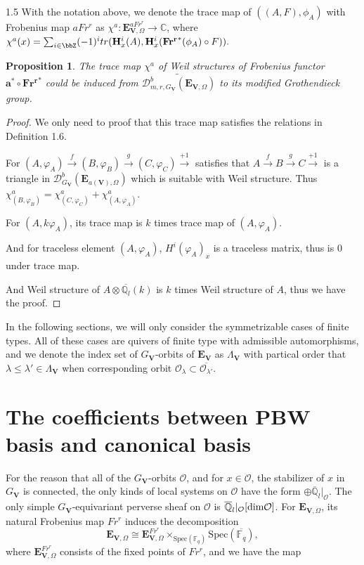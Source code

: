 \documentclass[10pt]{amsart}
\newtheorem{proposition}[theorem]{Proposition}
\def\bbC{{\mathbb C}}  \def\bbE{{\mathbb E}}  \def\bbP{{\mathbb P}}
\def\dim{\mbox{\rm dim}}   \def\End{\mbox{\rm End}}
\def\bfV{{\mathbf V}}
\def\bfV{\mathbf{V}}
\def\bfE{\mathbf{E}}
\newcommand\mo{{\mathcal{O}}}
\begin{document}
\begin{spacing}{1.5}
With the notation above, we denote the trace map of $((A,F),\phi_A)$ with Frobenius map $aFr^r$ as $\chi^a:\mathbf{E}_{\mathbf{V}, \Omega}^{aFr^r}\rightarrow \bbC$, where $\chi^a(x)=\sum_{i\in \bbZ}(-1)^itr(\mathbf{H}^i_x(A),\mathbf{H}^i_x(\mathbf{Fr^r}^*(\phi_A)\circ F)).$
\begin{proposition}\label{po1}
    The trace map $\chi^a$ of Weil structures of Frobenius functor $\mathbf{a}^*\circ \mathbf{Fr^r}^*$ could be induced from $\widetilde{\mathcal{D}^b_{m,r, G_{\mathbf{V}}}(\mathbf{E}_{\mathbf{V}, \Omega})}$ to its modified Grothendieck group.
\end{proposition}
\begin{proof}
    We only need to proof that this trace map satisfies the relations in Definition 1.6.

    For $(A, \varphi_A) \xrightarrow{f} (B, \varphi_B) \xrightarrow{g} (C, \varphi_C) \xrightarrow{+1} $ satisfies that $A\xrightarrow{f} B\xrightarrow{g} C \xrightarrow{+1}$ is a triangle in $\mathcal{D}^b_{G_{\mathbf{V}}}(\mathbf{E}_{a(\mathbf{V}), \Omega})$ which is suitable with Weil structure. Thus $\chi^a_{(B,\varphi_B)}=\chi^a_{(C,\varphi_C)}+\chi^a_{(A,\varphi_A)}$.

    For $(A,k\varphi_A)$, its trace map is $k$ times trace map of $(A,\varphi_A)$.

    And for traceless element $(A,\varphi_A)$, $H^i(\varphi_A)_x$ is a traceless matrix, thus is 0 under trace map.

    And Weil structure of $A\otimes \overline{\mathbb{Q}_l}(k)$ is $k$ times Weil structure of $A$, thus we have the proof.
\end{proof}
In the following sections, we will only consider the symmetrizable cases of finite types. All of these cases are quivers of finite type with admissible automorphisms, and we denote the index set of $G_{\mathbf{V}}$-orbits of $\bfE_{\bfV}$ as $\Lambda_{\bfV}$ with partical order that $\lambda\leqslant\lambda'\in \Lambda_{\bfV}$ when corresponding orbit $\mo_{\lambda}\subset \overline{\mo_{\lambda'}}$.

\section{The coefficients between PBW basis and canonical basis}

For the reason that all of the $G_{\mathbf{V}}$-orbits $\mathcal{O}$, and for $x \in \mathcal{O}$, the stabilizer of $x$ in $G_{\mathbf{V}}$ is connected, the only kinds of local systems on $\mathcal{O}$ have the form $\oplus \overline{\mathbb{Q}}_l|_{\mathcal{O}}$. The only simple $G_{\mathbf{V}}$-equivariant perverse sheaf on $\mathcal{O}$ is $\overline{\mathbb{Q}}_l|_{\mathcal{O}}[\dim \mathcal{O}]$. For $\mathbf{E}_{\mathbf{V}, \Omega}$, its natural Frobenius map $Fr^r$ induces the decomposition
$$
\mathbf{E}_{\mathbf{V}, \Omega} \cong \mathbf{E}_{\mathbf{V}, \Omega}^{Fr^r} \times_{\text{Spec}(\mathbb{F}_q)} \text{Spec}(\overline{\mathbb{F}_q}),
$$
where $\mathbf{E}_{\mathbf{V}, \Omega}^{Fr^r}$ consists of the fixed points of $Fr^r$, and we have the map


\end{spacing}
\end{document}
